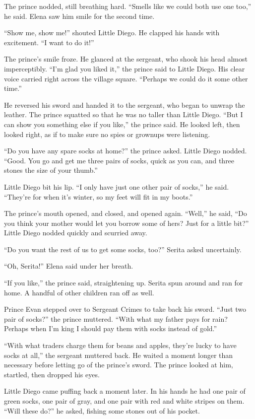\documentclass[10pt]{book}
\begin{document}
The prince nodded, still breathing hard. ``Smells like we could both use one too,'' he said. Elena saw him smile for the second time.

``Show me, show me!'' shouted Little Diego. He clapped his hands with excitement. ``I want to do it!''

The prince's smile froze. He glanced at the sergeant, who shook his head almost imperceptibly. ``I'm glad you liked it,'' the prince said to Little Diego. His clear voice carried right across the village square. ``Perhaps we could do it some other time.''

He reversed his sword and handed it to the sergeant, who began to unwrap the leather. The prince squatted so that he was no taller than Little Diego. ``But I can show you something else if you like,'' the prince said. He looked left, then looked right, as if to make sure no spies or grownups were listening.

``Do you have any spare socks at home?'' the prince asked. Little Diego nodded. ``Good. You go and get me three pairs of socks, quick as you can, and three stones the size of your thumb.''

Little Diego bit his lip. ``I only have just one other pair of socks,'' he said. ``They're for when it's winter, so my feet will fit in my boots.''

The prince's mouth opened, and closed, and opened again. ``Well,'' he said, ``Do you think your mother would let you borrow some of hers? Just for a little bit?'' Little Diego nodded quickly and scurried away.

``Do you want the rest of us to get some socks, too?'' Serita asked uncertainly.

``Oh, Serita!'' Elena said under her breath.

``If you like,'' the prince said, straightening up. Serita spun around and ran for home. A handful of other children ran off as well.

Prince Evan stepped over to Sergeant Crimes to take back his sword. ``Just two pair of socks?'' the prince muttered. ``With what my father pays for rain? Perhaps when I'm king I should pay them with socks instead of gold.''

``With what traders charge them for beans and apples, they're lucky to have socks at all,'' the sergeant muttered back. He waited a moment longer than necessary before letting go of the prince's sword. The prince looked at him, startled, then dropped his eyes.

Little Diego came puffing back a moment later. In his hands he had one pair of green socks, one pair of gray, and one pair with red and white stripes on them. ``Will these do?'' he asked, fishing some stones out of his pocket.
\end{document}
